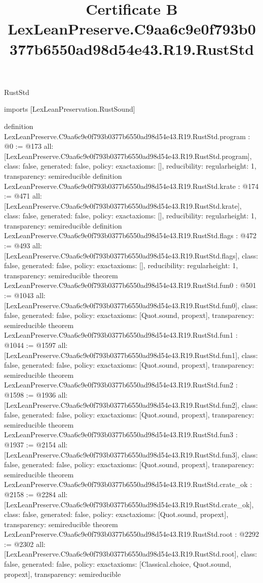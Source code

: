 \begin{lexlean}{RustStd}
\title{Certificate B LexLeanPreserve.C9aa6c9e0f793b0377b6550ad98d54e43.R19.RustStd}
\begin{coremodule}
imports [LexLeanPreservation.RustSound]

definition LexLeanPreserve.C9aa6c9e0f793b0377b6550ad98d54e43.R19.RustStd.program : @0 := @173 {
  all: [LexLeanPreserve.C9aa6c9e0f793b0377b6550ad98d54e43.R19.RustStd.program],
  class: false,
  generated: false,
  policy: exact{axioms: []},
  reducibility: regular{height: 1},
  transparency: semireducible
}
definition LexLeanPreserve.C9aa6c9e0f793b0377b6550ad98d54e43.R19.RustStd.krate : @174 := @471 {
  all: [LexLeanPreserve.C9aa6c9e0f793b0377b6550ad98d54e43.R19.RustStd.krate],
  class: false,
  generated: false,
  policy: exact{axioms: []},
  reducibility: regular{height: 1},
  transparency: semireducible
}
definition LexLeanPreserve.C9aa6c9e0f793b0377b6550ad98d54e43.R19.RustStd.flags : @472 := @493 {
  all: [LexLeanPreserve.C9aa6c9e0f793b0377b6550ad98d54e43.R19.RustStd.flags],
  class: false,
  generated: false,
  policy: exact{axioms: []},
  reducibility: regular{height: 1},
  transparency: semireducible
}
theorem LexLeanPreserve.C9aa6c9e0f793b0377b6550ad98d54e43.R19.RustStd.fun0 : @501 := @1043 {
  all: [LexLeanPreserve.C9aa6c9e0f793b0377b6550ad98d54e43.R19.RustStd.fun0],
  class: false,
  generated: false,
  policy: exact{axioms: [Quot.sound, propext]},
  transparency: semireducible
}
theorem LexLeanPreserve.C9aa6c9e0f793b0377b6550ad98d54e43.R19.RustStd.fun1 : @1044 := @1597 {
  all: [LexLeanPreserve.C9aa6c9e0f793b0377b6550ad98d54e43.R19.RustStd.fun1],
  class: false,
  generated: false,
  policy: exact{axioms: [Quot.sound, propext]},
  transparency: semireducible
}
theorem LexLeanPreserve.C9aa6c9e0f793b0377b6550ad98d54e43.R19.RustStd.fun2 : @1598 := @1936 {
  all: [LexLeanPreserve.C9aa6c9e0f793b0377b6550ad98d54e43.R19.RustStd.fun2],
  class: false,
  generated: false,
  policy: exact{axioms: [Quot.sound, propext]},
  transparency: semireducible
}
theorem LexLeanPreserve.C9aa6c9e0f793b0377b6550ad98d54e43.R19.RustStd.fun3 : @1937 := @2154 {
  all: [LexLeanPreserve.C9aa6c9e0f793b0377b6550ad98d54e43.R19.RustStd.fun3],
  class: false,
  generated: false,
  policy: exact{axioms: [Quot.sound, propext]},
  transparency: semireducible
}
theorem LexLeanPreserve.C9aa6c9e0f793b0377b6550ad98d54e43.R19.RustStd.crate_ok : @2158 := @2284 {
  all: [LexLeanPreserve.C9aa6c9e0f793b0377b6550ad98d54e43.R19.RustStd.crate_ok],
  class: false,
  generated: false,
  policy: exact{axioms: [Quot.sound, propext]},
  transparency: semireducible
}
theorem LexLeanPreserve.C9aa6c9e0f793b0377b6550ad98d54e43.R19.RustStd.root : @2292 := @2302 {
  all: [LexLeanPreserve.C9aa6c9e0f793b0377b6550ad98d54e43.R19.RustStd.root],
  class: false,
  generated: false,
  policy: exact{axioms: [Classical.choice, Quot.sound, propext]},
  transparency: semireducible
}


\end{coremodule}
\end{lexlean}
